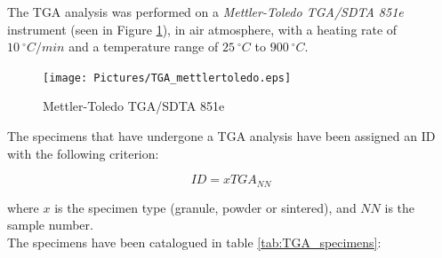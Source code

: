 \documentclass{article}
\begin{document}
            The TGA analysis was performed on a \textit{Mettler-Toledo TGA/SDTA 851e} instrument (seen in Figure \ref{fig:TGA_mettlertoledo}), 
            in air atmosphere, with a heating rate of $10 \ ^{\circ}C/min$ and a temperature range of $25 \ ^{\circ}C$ to $900 \ ^{\circ}C$. \\

            \begin{figure}[ht]
                \centering
                \texttt{[image: Pictures/TGA\_mettlertoledo.eps]}
                \caption{Mettler-Toledo TGA/SDTA 851e}
                \label{fig:TGA_mettlertoledo}
            \end{figure}

            The specimens that have undergone a TGA analysis have been assigned an ID with the following criterion:

                \begin{equation}
                    ID = xTGA_{NN}
                    \label{eq:TGA_ID}
                \end{equation}

            where $x$ is the specimen type (granule, powder or sintered), and $NN$ is the sample number. \\

            The specimens have been catalogued in table \ref{tab:TGA_specimens}:

                    \begin{table}[ht]
                        \centering
                        \caption{TGA specimens}
        
                        \label{tab:TGA_specimens}
                    \end{table}
\end{document}

